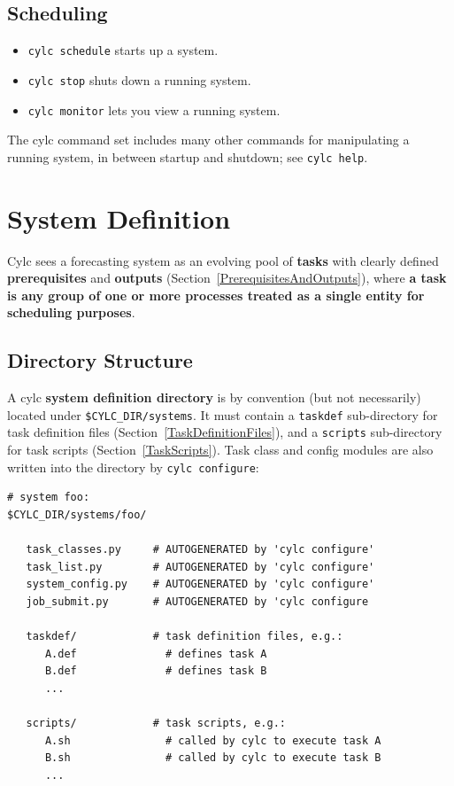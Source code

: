 \documentclass[11pt,a4paper]{article}
\begin{document}
\subsection{Scheduling}
\label{QuickScheduling}

\begin{itemize}
    \item \lstinline=cylc schedule= starts up a system.
    \item \lstinline=cylc stop= shuts down a running system.
    \item \lstinline=cylc monitor= lets you view a running system.
\end{itemize}

The cylc command set includes many other commands for manipulating a
running system, in between startup and shutdown; see 
\lstinline=cylc help=.
 
\section{System Definition} 
\label{SystemDefinition}

Cylc sees a forecasting system as an evolving pool of {\bf tasks} with
clearly defined {\bf prerequisites} and {\bf outputs}
(Section~\ref{PrerequisitesAndOutputs}), where {\bf a task is any group
of one or more processes treated as a single entity for scheduling
purposes}.

\subsection{Directory Structure} 
\label{DirectoryStructure}

A cylc {\bf system definition directory} is by convention 
(but not necessarily) located under \lstinline=$CYLC_DIR/systems=. It
must contain a \lstinline=taskdef= sub-directory for task definition
files (Section~\ref{TaskDefinitionFiles}), and a \lstinline=scripts=
sub-directory for task scripts (Section~\ref{TaskScripts}). Task class
and config modules are also written into the directory by
\lstinline=cylc configure=: 

\lstset{language=bash}

\begin{lstlisting}
# system foo:
$CYLC_DIR/systems/foo/

   task_classes.py     # AUTOGENERATED by 'cylc configure' 
   task_list.py        # AUTOGENERATED by 'cylc configure' 
   system_config.py    # AUTOGENERATED by 'cylc configure' 
   job_submit.py       # AUTOGENERATED by 'cylc configure

   taskdef/            # task definition files, e.g.:
      A.def              # defines task A
      B.def              # defines task B
      ...

   scripts/            # task scripts, e.g.:
      A.sh               # called by cylc to execute task A
      B.sh               # called by cylc to execute task B
      ...
\end{lstlisting}
\end{document}
